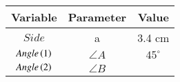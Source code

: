 \begin{center}
    \begin{tabular}{|c|c|c|} 
        \hline
            \textbf{Variable} & \textbf{Parameter} & \textbf{Value} \\ 
        \hline
            $Side$ & a & 3.4 cm \\ 
        \hline
            $Angle\left(1\right)$ & $\angle{A}$ & $45^\circ$ \\ 
        \hline
            $Angle\left(2\right)$ & $\angle{B}$ & \\ 
        \hline
    \end{tabular}
\end{center}  
